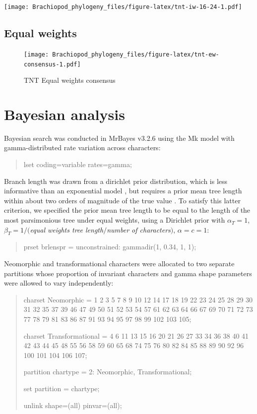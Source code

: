 \documentclass[]{book}
\theoremstyle{definition}
\theoremstyle{definition}
\theoremstyle{definition}
\theoremstyle{remark}
\begin{document}
\texttt{[image: Brachiopod\_phylogeny\_files/figure-latex/tnt-iw-16-24-1.pdf]}

\hypertarget{equal-weights}{%
\section{Equal weights}\label{equal-weights}}

\begin{figure}
\centering
\texttt{[image: Brachiopod\_phylogeny\_files/figure-latex/tnt-ew-consensus-1.pdf]}
\caption{\label{fig:tnt-ew-consensus}TNT Equal weights consensus}
\end{figure}

\hypertarget{bayesian}{%
\chapter{Bayesian analysis}\label{bayesian}}

Bayesian search was conducted in MrBayes v3.2.6 \citep{Ronquist2012}
using the Mk model \citep{Lewis2001} with gamma-distributed rate
variation across characters:

\begin{quote}
lset coding=variable rates=gamma;
\end{quote}

Branch length was drawn from a dirichlet prior distribution, which is
less informative than an exponential model \citep{Rannala2012}, but
requires a prior mean tree length within about two orders of magnitude
of the true value \citep{Zhang2012}. To satisfy this latter criterion,
we specified the prior mean tree length to be equal to the length of the
most parsimonious tree under equal weights, using a Dirichlet prior with
\(\alpha_T = 1\), \(\beta_T = 1/(\)\emph{equal weights tree
length}\(/\)\emph{number of characters}\()\), \(\alpha = c = 1\):

\begin{quote}
prset brlenspr = unconstrained: gammadir(1, 0.34, 1, 1);
\end{quote}

Neomorphic and transformational characters
\citep[\emph{sensu}][]{Sereno2007} were allocated to two separate
partitions whose proportion of invariant characters and gamma shape
parameters were allowed to vary independently:

\begin{quote}
charset Neomorphic = 1 2 3 5 7 8 9 10 12 14 17 18 19 22 23 24 25 28 29
30 31 32 35 37 39 46 47 49 50 51 52 53 54 57 61 62 63 64 66 67 69 70 71
72 73 77 78 79 81 83 86 87 91 93 94 95 97 98 99 102 103 105;

charset Transformational = 4 6 11 13 15 16 20 21 26 27 33 34 36 38 40 41
42 43 44 45 48 55 56 58 59 60 65 68 74 75 76 80 82 84 85 88 89 90 92 96
100 101 104 106 107;

partition chartype = 2: Neomorphic, Transformational;

set partition = chartype;

unlink shape=(all) pinvar=(all);
\end{quote}
\end{document}
